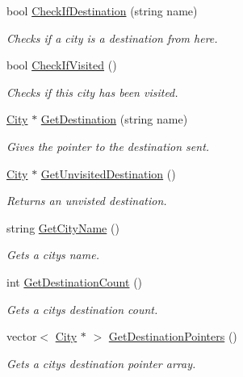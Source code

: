 \begin{DoxyCompactItemize}
bool \hyperlink{class_city_ada2ad0e409063956d0bd82dfad6667df}{Check\+If\+Destination} (string name)
\begin{DoxyCompactList}\small\item\em Checks if a city is a destination from here. \end{DoxyCompactList}\item 
bool \hyperlink{class_city_af6e248632554a3ba5f5999eb19000837}{Check\+If\+Visited} ()
\begin{DoxyCompactList}\small\item\em Checks if this city has been visited. \end{DoxyCompactList}\item 
\hyperlink{class_city}{City} $\ast$ \hyperlink{class_city_a46ff78ebb26f8aaa25d23dbcf296f121}{Get\+Destination} (string name)
\begin{DoxyCompactList}\small\item\em Gives the pointer to the destination sent. \end{DoxyCompactList}\item 
\hyperlink{class_city}{City} $\ast$ \hyperlink{class_city_a19f04a7a972a58f5debb1b72364afafd}{Get\+Unvisited\+Destination} ()
\begin{DoxyCompactList}\small\item\em Returns an unvisted destination. \end{DoxyCompactList}\item 
string \hyperlink{class_city_acdd0526d294a362ad1b5b373ad999694}{Get\+City\+Name} ()
\begin{DoxyCompactList}\small\item\em Gets a city\textquotesingle{}s name. \end{DoxyCompactList}\item 
int \hyperlink{class_city_aff27965498fbd464b154d2f123f2579d}{Get\+Destination\+Count} ()
\begin{DoxyCompactList}\small\item\em Gets a city\textquotesingle{}s destination count. \end{DoxyCompactList}\item 
vector$<$ \hyperlink{class_city}{City} $\ast$ $>$ \hyperlink{class_city_a69ee9c91586b999dd3f67f5d2e28ac48}{Get\+Destination\+Pointers} ()
\begin{DoxyCompactList}\small\item\em Gets a city\textquotesingle{}s destination pointer array. \end{DoxyCompactList}\item 

\end{DoxyCompactItemize}
